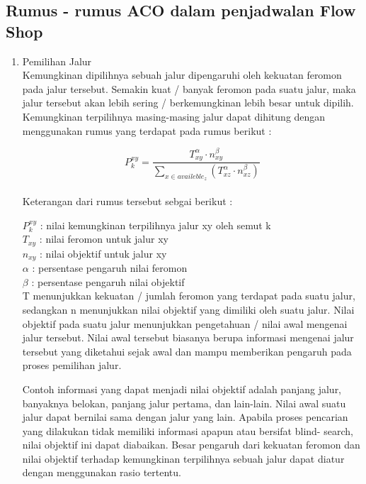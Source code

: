 \subsection{Rumus - rumus ACO dalam penjadwalan Flow Shop}
\begin{enumerate}
	\item Pemilihan Jalur\\
	Kemungkinan dipilihnya sebuah jalur dipengaruhi oleh kekuatan feromon pada jalur tersebut. Semakin
	kuat / banyak feromon pada suatu jalur, maka jalur tersebut akan lebih sering / berkemungkinan
	lebih besar untuk dipilih. Kemungkinan terpilihnya masing-masing jalur dapat dihitung
	dengan menggunakan rumus yang terdapat pada rumus berikut :
	
	\begin{equation}
	P_{k}^{xy} = \frac{T_{xy}^{\alpha}\cdot n_{xy}^{\beta}}{\sum_{x \in availeble_z}(T_{xz}^{\alpha }\cdot n_{xz}^{\beta })}
	\end{equation}\\
	
	
	Keterangan dari rumus tersebut sebgai berikut :
	
	$P_{k}^{xy}$ : nilai kemungkinan terpilihnya jalur xy oleh semut k \\
	$T_{xy}$ : nilai feromon untuk jalur xy\\
	$n_{xy}$ : nilai objektif untuk jalur xy\\
	$\alpha$ : persentase pengaruh nilai feromon\\
	$\beta$  : persentase pengaruh nilai objektif\\
	
	
	T menunjukkan kekuatan / jumlah feromon yang terdapat pada suatu jalur, sedangkan n menunjukkan
	nilai objektif yang dimiliki oleh suatu jalur. Nilai objektif pada suatu jalur menunjukkan
	pengetahuan / nilai awal mengenai jalur tersebut. Nilai awal tersebut biasanya berupa informasi
	mengenai jalur tersebut yang diketahui sejak awal dan mampu memberikan pengaruh pada proses
	pemilihan jalur.
	
	Contoh informasi yang dapat menjadi nilai objektif adalah panjang jalur, banyaknya belokan,
	panjang jalur pertama, dan lain-lain. Nilai awal suatu jalur dapat bernilai sama dengan jalur yang
	lain. Apabila proses pencarian yang dilakukan tidak memiliki informasi apapun atau bersifat blind-
	search, nilai objektif ini dapat diabaikan. Besar pengaruh dari kekuatan feromon dan nilai objektif
	terhadap kemungkinan terpilihnya sebuah jalur dapat diatur dengan menggunakan rasio tertentu.
	

\end{enumerate}
